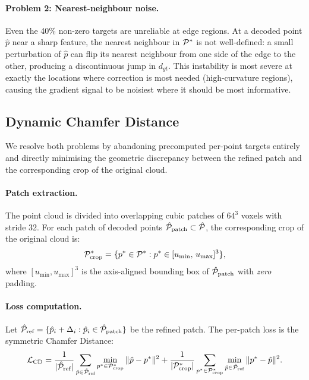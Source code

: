 \paragraph{Problem 2: Nearest-neighbour noise.}
Even the 40\% non-zero targets are unreliable at edge regions.
At a decoded point $\hat{p}$ near a sharp feature, the nearest neighbour in
$\mathcal{P}^*$ is not well-defined: a small perturbation of $\hat{p}$ can flip its
nearest neighbour from one side of the edge to the other, producing a
discontinuous jump in $d_{gt}$.
This instability is most severe at exactly the locations where correction
is most needed (high-curvature regions), causing the gradient signal to be
noisiest where it should be most informative.

\subsection{Dynamic Chamfer Distance}
\label{ssec:dcd}

We resolve both problems by abandoning precomputed per-point targets entirely
and directly minimising the geometric discrepancy between the refined patch
and the corresponding crop of the original cloud.

\paragraph{Patch extraction.}
The point cloud is divided into overlapping cubic patches of $64^3$ voxels
with stride 32.
For each patch of decoded points $\hat{\mathcal{P}}_{\text{patch}} \subset \hat{\mathcal{P}}$,
the corresponding crop of the original cloud is:
\begin{equation}
  \mathcal{P}^*_{\text{crop}} = \{p^* \in \mathcal{P}^* : p^* \in [u_{\min},\, u_{\max}]^3\},
\end{equation}
where $[u_{\min}, u_{\max}]^3$ is the axis-aligned bounding box of
$\hat{\mathcal{P}}_{\text{patch}}$ with \emph{zero} padding.

\paragraph{Loss computation.}
Let $\hat{\mathcal{P}}_{\text{ref}} = \{\hat{p}_i + \Delta_i : \hat{p}_i \in \hat{\mathcal{P}}_{\text{patch}}\}$
be the refined patch.
The per-patch loss is the symmetric Chamfer Distance:
\begin{equation}
  \mathcal{L}_{\text{CD}} =
    \frac{1}{|\hat{\mathcal{P}}_{\text{ref}}|}\sum_{\hat{p} \in \hat{\mathcal{P}}_{\text{ref}}}
      \min_{p^* \in \mathcal{P}^*_{\text{crop}}} \|\hat{p} - p^*\|^2
    + \frac{1}{|\mathcal{P}^*_{\text{crop}}|}\sum_{p^* \in \mathcal{P}^*_{\text{crop}}}
      \min_{\hat{p} \in \hat{\mathcal{P}}_{\text{ref}}} \|p^* - \hat{p}\|^2.
  \label{eq:cd-loss}
\end{equation}

